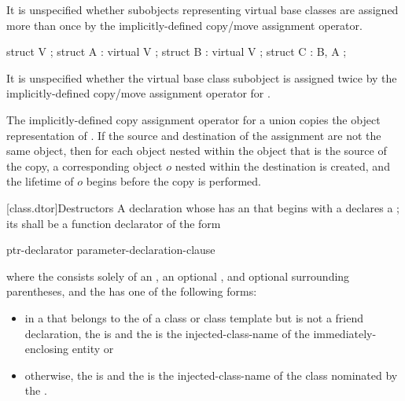 %
It is unspecified whether subobjects representing virtual base classes
are assigned more than once by the implicitly-defined copy/move assignment
operator.
\begin{example}
\begin{codeblock}
struct V { };
struct A : virtual V { };
struct B : virtual V { };
struct C : B, A { };
\end{codeblock}

It is unspecified whether the virtual base class subobject
is assigned twice by the implicitly-defined copy/move assignment operator for
.
\end{example}

\pnum
The implicitly-defined copy assignment operator for a
union  copies the object representation of .
If the source and destination of the assignment are not the same object, then
for each object nested within
the object that is the source of the copy,
a corresponding object $o$ nested within the destination is created,
and the lifetime of $o$ begins before the copy is performed.

[class.dtor]{Destructors}%
%
%
\pnum
A declaration whose 
has an  that begins with a \tcode{\~}
declares a ;
its  shall be a function declarator of the form
\begin{ncbnf}
ptr-declarator \terminal{(} parameter-declaration-clause \terminal{)}  
\end{ncbnf}
where the  consists solely of an
, an optional ,
and optional surrounding parentheses, and the  has
one of the following forms:
\begin{itemize}
\item
in a  that belongs to the
 of a class or class template
but is not a friend
declaration, the  is
\tcode{\~} and the  is the
injected-class-name of the immediately-enclosing entity or

\item
otherwise, the
 is 
\tcode{\~} and the 
is the injected-class-name of the
class nominated by the .
\end{itemize}

